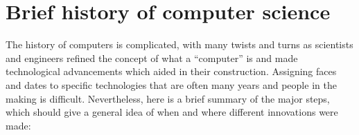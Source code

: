 \section{Brief history of computer science}

The history of computers is complicated, with many twists and turns as scientists and engineers refined the concept of what a ``computer'' is and made technological advancements which aided in their construction. Assigning faces and dates to specific technologies that are often many years and people in the making is difficult. 
Nevertheless, here is a brief summary of the major steps, which should give a general idea of when and where different innovations were made:

